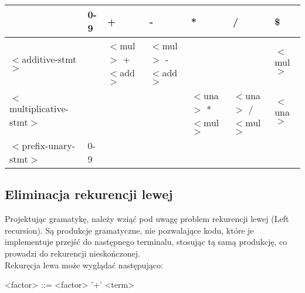 		\begin{center}
			\setlength{\tabcolsep}{0.5em}
			\renewcommand{\arraystretch}{1.5}
			\begin{tabular}{ | L{4.1cm} | L{2cm} | L{2cm} | L{2cm} | L{2cm} | L{2cm} | L{2cm} | }
              	\hline
              	       & 0-9    & +    & -    & *    & /    & \$ \\
              	\hline
          	 	$<$additive-stmt$>$
          	 	       &        & $<$mul$>$ + $<$add$>$
          	 	                & $<$mul$>$ - $<$add$>$
          	 	                & & & $<$mul$>$ \\
              	\hline
              	$<$multiplicative-stmt$>$ 
              		   &        & & & $<$una$>$ * $<$mul$>$
              		                & $<$una$>$ / $<$mul$>$
              		                & $<$una$>$ \\
              	\hline
              	$<$prefix-unary-stmt$>$
              	       & 0-9 & & & & & \\
              	\hline
			\end{tabular}
		\end{center}

		\spacing

		\begin{center}
		\end{center}

	\subsection{Eliminacja rekurencji lewej}

		Projektując gramatykę, należy wziąć pod uwagę problem rekurencji lewej (Left recursion).
		Są produkcje gramatyczne, nie pozwalające kodu, które je implementuje przejść do następnego
		terminalu, stosując tą samą produkcję, co prowadzi do rekurencji nieskończonej.
		\\
		
		Rekuręcja lewa może wyglądać następująco:

		\begin{grammar}
			<factor> ::= <factor> '+' <term>
		\end{grammar}

